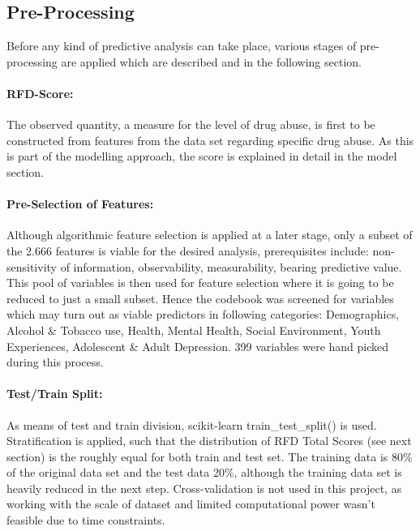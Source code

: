 \documentclass[12pt]{article}
\begin{document}
\subsection{Pre-Processing}
Before any kind of predictive analysis can take place, various stages of pre-processing are applied which are described and in the following section.

\paragraph*{RFD-Score:}
The observed quantity, a measure for the level of drug abuse, is first to be constructed from features from the data set regarding specific drug abuse. As this is part of the modelling approach, the score is explained in detail in the model section. 

\paragraph*{Pre-Selection of Features:}
Although algorithmic feature selection is applied at a later stage, only a subset of the 2.666 features is viable for the desired analysis, prerequisites include: non-sensitivity of information, observability, measurability, bearing predictive value. This pool of variables is then used for feature selection where it is going to be reduced to just a small subset. 
Hence the codebook was screened for variables which may turn out as viable predictors in following categories: Demographics, Alcohol \& Tobacco use, Health, Mental Health, Social Environment, Youth Experiences, Adolescent \& Adult Depression. 399 variables were hand picked during this process.


\paragraph*{Test/Train Split:}
As means of test and train division, scikit-learn train\_test\_split() is used. Stratification is applied, such that the distribution of RFD Total Scores (see next section) is the roughly equal for both train and test set. The training data is 80\% of the original data set and the test data 20\%, although the training data set is heavily reduced in the next step. Cross-validation is not used in this project, as working with the scale of dataset and limited computational power wasn’t feasible due to time constraints.
                                                                                                                                                                                                                                                                        
\end{document}
